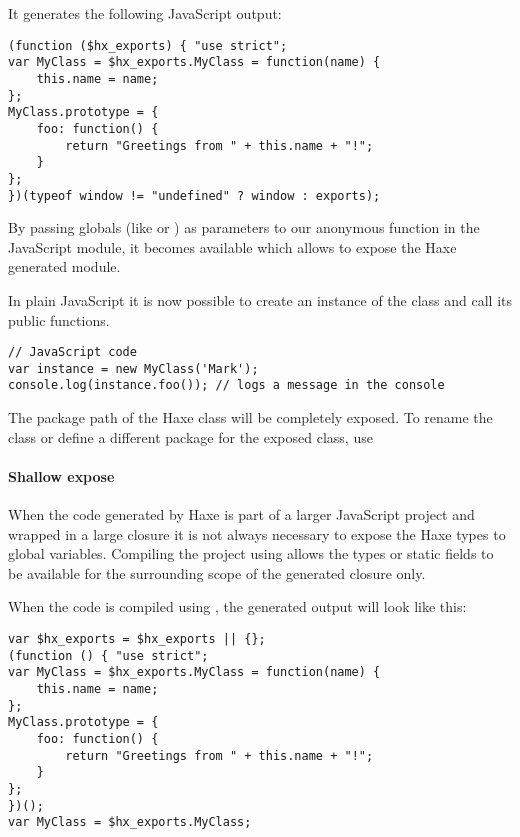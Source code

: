 
It generates the following JavaScript output:

\begin{lstlisting}
(function ($hx_exports) { "use strict";
var MyClass = $hx_exports.MyClass = function(name) {
	this.name = name;
};
MyClass.prototype = {
	foo: function() {
		return "Greetings from " + this.name + "!";
	}
};
})(typeof window != "undefined" ? window : exports);
\end{lstlisting}

By passing globals (like  or ) as parameters to our anonymous function in the JavaScript module, it becomes available which allows to expose the Haxe generated module.

In plain JavaScript it is now possible to create an instance of the class and call its public functions.

\begin{lstlisting}
// JavaScript code
var instance = new MyClass('Mark');
console.log(instance.foo()); // logs a message in the console
\end{lstlisting}

The package path of the Haxe class will be completely exposed. To rename the class or define a different package for the exposed class, use 

\paragraph{Shallow expose}

When the code generated by Haxe is part of a larger JavaScript project and wrapped in a large closure it is not always necessary to expose the Haxe types to global variables.
Compiling the project using  allows the types or static fields to be available for the surrounding scope of the generated closure only.

When the code is compiled using , the generated output will look like this:

\begin{lstlisting}
var $hx_exports = $hx_exports || {};
(function () { "use strict";
var MyClass = $hx_exports.MyClass = function(name) {
	this.name = name;
};
MyClass.prototype = {
	foo: function() {
		return "Greetings from " + this.name + "!";
	}
};
})();
var MyClass = $hx_exports.MyClass;
\end{lstlisting}

